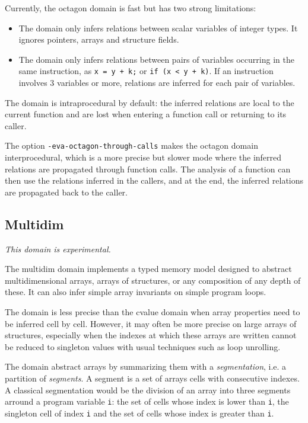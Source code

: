 \documentclass[web]{frama-c-book}
\begin{document}
Currently, the octagon domain is fast but has two strong limitations:
\begin{itemize}
\item
  The domain only infers relations between scalar variables of integer types.
  It ignores pointers, arrays and structure fields.
\item
  The domain only infers relations between pairs of variables occurring in the
  same instruction, as \lstinline|x = y + k;| or \lstinline|if (x < y + k)|.
  If an instruction involves 3 variables or more, relations are inferred for
  each pair of variables.
\end{itemize}

The domain is intraprocedural by default: the inferred relations are local to
the current function and are lost when entering a function call or returning
to its caller.

The option \verb+-eva-octagon-through-calls+ makes the octagon domain
interprocedural, which is a more precise but slower mode where
the inferred relations are propagated through function calls.
The analysis of a function can then use the relations inferred in the callers,
and at the end, the inferred relations are propagated back to the caller.


\subsection{Multidim}
\label{sec:multidim}

\emph{This domain is experimental.}

The multidim domain implements a typed memory model designed to abstract
multidimensional arrays, arrays of structures, or any composition of any depth
of these. It can also infer simple array invariants on simple program loops.

The domain is less precise than the cvalue domain when array properties need
to be inferred cell by cell.
However, it may often be more precise on large arrays of structures, especially
when the indexes at which these arrays are written cannot be
reduced to singleton values with usual techniques such as loop unrolling.

The domain abstract arrays by summarizing them with a {\it segmentation}, i.e. a
partition of {\it segments}. A segment is a set of arrays cells with consecutive
indexes. A classical segmentation would be the division of an array into three
segments arround a program variable {\tt i}: the set of cells whose index is
lower than {\tt i}, the singleton cell of index {\tt i} and the set of cells
whose index is greater than {\tt i}.
\end{document}
